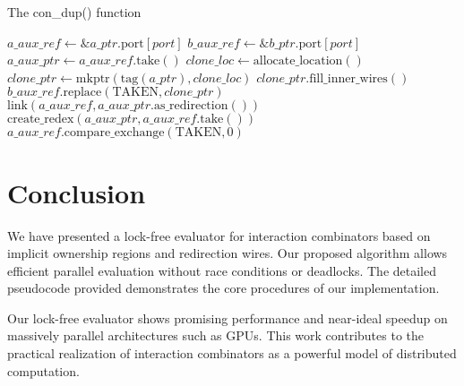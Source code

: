 \documentclass{article}
\begin{document}
\begin{algorithm}
\caption{The con\_dup() function}\label{alg:con_dup}
\begin{algorithmic}[1]
    \State $a\_aux\_ref \gets \&a\_ptr.\text{port}[port]$
    \State $b\_aux\_ref \gets \&b\_ptr.\text{port}[port]$
    \State $a\_aux\_ptr \gets a\_aux\_ref.\text{take}()$
    \State $clone\_loc \gets \text{allocate\_location}()$
    \State $clone\_ptr \gets \text{mkptr}(\text{tag}(a\_ptr), clone\_loc)$
    \State $clone\_ptr.\text{fill\_inner\_wires}()$
    \State $b\_aux\_ref.\text{replace}(\text{TAKEN}, clone\_ptr)$
        \State $\text{link}(a\_aux\_ref, a\_aux\_ptr.\text{as\_redirection}())$
    \EndIf
        \State $\text{create\_redex}(a\_aux\_ptr, a\_aux\_ref.\text{take}())$
        \State $a\_aux\_ref.\text{compare\_exchange}(\text{TAKEN}, 0)$
    \EndIf
\EndProcedure
\end{algorithmic}
\end{algorithm}

\section{Conclusion}\label{s:conclusion}

We have presented a lock-free evaluator for interaction combinators based on implicit ownership regions and redirection wires. Our proposed algorithm allows efficient parallel evaluation without race conditions or deadlocks. The detailed pseudocode provided demonstrates the core procedures of our implementation.

Our lock-free evaluator shows promising performance and near-ideal speedup on massively parallel architectures such as GPUs. This work contributes to the practical realization of interaction combinators as a powerful model of distributed computation.



\end{document}
